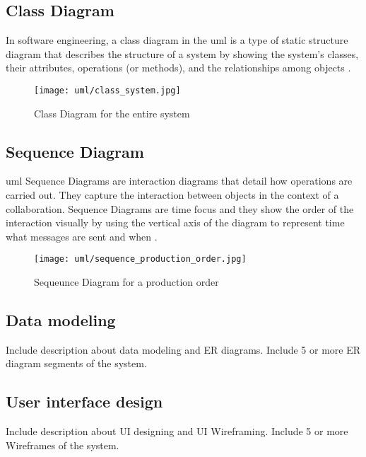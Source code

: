 \documentclass[12pt]{report}
\begin{document}
\newpage
\subsection{Class Diagram}
In software engineering, a class diagram in the \acrfull{uml} is a type of static structure diagram that describes the structure of a system by showing the system's classes, their attributes, operations (or methods), and the relationships among objects \cite{paradigm_2018_uml}.

\begin{figure}[H]
	\centering
	\texttt{[image: uml/class\_system.jpg]}
	\caption{Class Diagram for the entire system}
\end{figure}

\newpage
\subsection{Sequence Diagram}
\acrshort{uml} Sequence Diagrams are interaction diagrams that detail how operations are carried out. They capture the interaction between objects in the context of a collaboration. Sequence Diagrams are time focus and they show the order of the interaction visually by using the vertical axis of the diagram to represent time what messages are sent and when \cite{paradigm_2018_uml}.

\begin{figure}[H]
	\centering
	\texttt{[image: uml/sequence\_production\_order.jpg]}
	\caption{Sequeunce Diagram for a production order}
\end{figure}

\newpage
\subsection{Data modeling}
Include description about data modeling and ER diagrams.
Include 5 or more ER diagram segments of the system.

\subsection{User interface design}
Include description about UI designing and UI Wireframing.
Include 5 or more Wireframes of the system.


\singlespacing
\printbibliography[title={References}]
\end{document}
